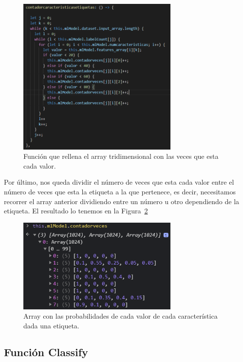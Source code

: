 \documentclass[a4paper, 12pt]{book}
\begin{document}
\begin{figure}
	\centering
	\includegraphics[width=8cm, keepaspectratio]{img/funcioncontador}
	\caption{Función que rellena el array tridimensional con las veces que esta cada valor.}			
	\label{fig:funcioncontador}
\end{figure}

Por último, nos queda dividir el número de veces que esta cada valor entre el número de veces que esta la etiqueta a la que pertenece, es decir, necesitamos recorrer el array anterior dividiendo entre un número u otro dependiendo de la etiqueta. El resultado lo tenemos en la Figura~\ref{fig:probabilidadescalculadas}

\begin{figure}
	\centering
	\includegraphics[width=8cm, keepaspectratio]{img/probabilidadescalculadas}
	\caption{Array con las probabilidades de cada valor de cada característica dada una etiqueta.}			
	\label{fig:probabilidadescalculadas}
\end{figure}


\subsection{Función Classify} 
\label{sec:funcionclassifybayes}
\end{document}
